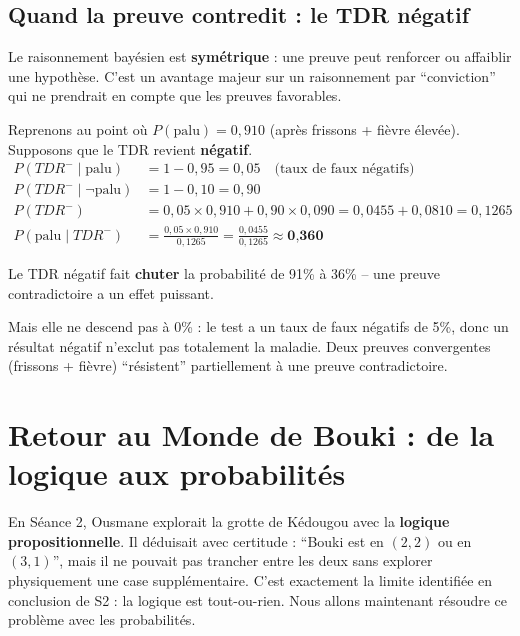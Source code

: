\documentclass[11pt,a4paper]{article}
\begin{document}
\subsection{Quand la preuve contredit : le TDR négatif}

Le raisonnement bayésien est \textbf{symétrique} : une preuve peut renforcer ou affaiblir une hypothèse. C'est un avantage majeur sur un raisonnement par ``conviction'' qui ne prendrait en compte que les preuves favorables.

\begin{exemplebox}
Reprenons au point où $P(\text{palu}) = 0{,}910$ (après frissons + fièvre élevée). Supposons que le TDR revient \textbf{négatif}.
\begin{align*}
P(TDR^- \mid \text{palu}) &= 1 - 0{,}95 = 0{,}05 \quad \text{(taux de faux négatifs)} \\
P(TDR^- \mid \neg\text{palu}) &= 1 - 0{,}10 = 0{,}90 \\[5pt]
P(TDR^-) &= 0{,}05 \times 0{,}910 + 0{,}90 \times 0{,}090 = 0{,}0455 + 0{,}0810 = 0{,}1265 \\[5pt]
P(\text{palu} \mid TDR^-) &= \frac{0{,}05 \times 0{,}910}{0{,}1265} = \frac{0{,}0455}{0{,}1265} \approx \textbf{0,360}
\end{align*}

Le TDR négatif fait \textbf{chuter} la probabilité de 91\% à 36\% -- une preuve contradictoire a un effet puissant.

Mais elle ne descend pas à 0\% : le test a un taux de faux négatifs de 5\%, donc un résultat négatif n'exclut pas totalement la maladie. Deux preuves convergentes (frissons + fièvre) ``résistent'' partiellement à une preuve contradictoire.
\end{exemplebox}

\section{Retour au Monde de Bouki : de la logique aux probabilités}

En Séance 2, Ousmane explorait la grotte de Kédougou avec la \textbf{logique propositionnelle}. Il déduisait avec certitude : ``Bouki est en $(2,2)$ ou en $(3,1)$'', mais il ne pouvait pas trancher entre les deux sans explorer physiquement une case supplémentaire. C'est exactement la limite identifiée en conclusion de S2 : la logique est tout-ou-rien. Nous allons maintenant résoudre ce problème avec les probabilités.
\end{document}
